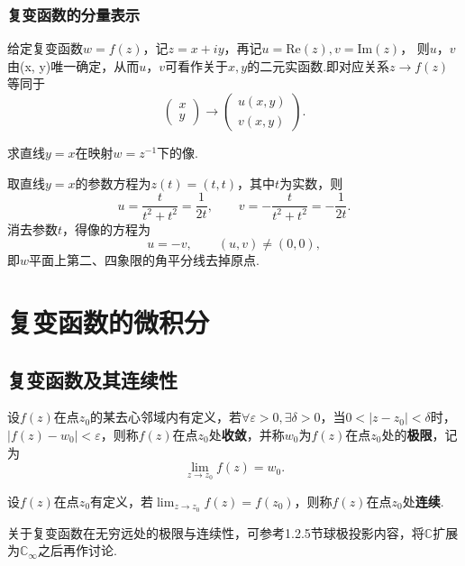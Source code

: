 \documentclass[openany,oneside]{ctexbook}
\begin{document}
\subsection{复变函数的分量表示}
    给定复变函数$w = f(z)$，记$z = x + iy$，再记$u = \mathrm{Re}(z), v = \mathrm{Im}(z)$，
    则$u$，$v$由(x, y)唯一确定，从而$u$，$v$可看作关于$x, y$的二元实函数.即对应关系$z\to f(z)$等同于
    \[
    \left(
        \begin{array}{l}
            x\\
            y
        \end{array}
    \right)\to
    \left(
        \begin{array}{l}
            u(x, y)\\
            v(x, y)
        \end{array}
    \right).
    \]
\begin{example}
    求直线$y = x$在映射$w = z^{-1}$下的像.
\end{example}
\begin{solution}

    取直线$y = x$的参数方程为$z(t) = (t,t)$，其中$t$为实数，则
    \[
        u = \frac{t}{t^2 + t^2} = \frac{1}{2t}, \qquad
        v = -\frac{t}{t^2 + t^2} = -\frac{1}{2t}.
    \]
    消去参数$t$，得像的方程为
    \[
        u = -v, \qquad (u,v)\neq(0,0),
    \]
    即$w$平面上第二、四象限的角平分线去掉原点.
\end{solution}
\newpage
\chapter{复变函数的微积分}
\section{复变函数及其连续性}
\begin{definition}[复变函数的极限]
设$f(z)$在点$z_0$的某去心邻域内有定义，若$\forall\varepsilon > 0,\exists\delta > 0$，当$0 < |z - z_0| < \delta$时，$|f(z) - w_0| < \varepsilon$，则称$f(z)$在点$z_0$处\textbf{收敛}，并称$w_0$为$f(z)$在点$z_0$处的\textbf{极限}，记为
\[\lim_{z \to z_0} f(z) = w_0.
\]
\end{definition}
\begin{definition}[复变函数的连续性]
  设$f(z)$在点$z_0$有定义，若$\lim_{z \to z_0} f(z) = f(z_0)$，则称$f(z)$在点$z_0$处\textbf{连续}.  
\end{definition}
\par 关于复变函数在无穷远处的极限与连续性，可参考1.2.5节球极投影内容，将$\mathbb{C}$扩展为$\mathbb{C}_\infty$之后再作讨论.
\end{document}
